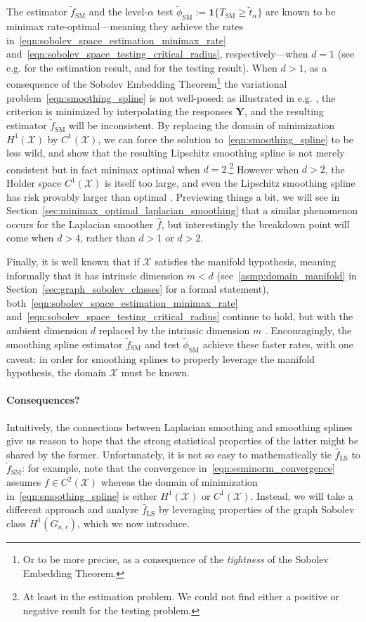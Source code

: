 \documentclass{article}
\newcommand{\1}{\mathbf{1}}
\newcommand{\Xset}{\mathcal{X}}
\newcommand{\wt}[1]{\widetilde{#1}}
\newcommand{\wh}[1]{\widehat{#1}}
\newcommand{\LS}{\mathrm{LS}}
\newcommand{\SM}{\mathrm{SM}}
\theoremstyle{alden}
\theoremstyle{aldenthm}
\theoremstyle{definition}
\theoremstyle{remark}
\begin{document}
The estimator $\wt{f}_{\SM}$ and the level-$\alpha$ test $\wt{\phi}_{\SM} := \1\{T_{\SM} \geq \wt{t}_{\alpha}\}$ are known to be minimax rate-optimal---meaning they achieve the rates in~\eqref{eqn:sobolev_space_estimation_minimax_rate} and~\eqref{eqn:sobolev_space_testing_critical_radius}, respectively---when $d = 1$ (see e.g. \cite{vandergeer2000} for the estimation result, and \cite{liu2019} for the testing result). When $d > 1$, as a consequence of the Sobolev Embedding Theorem\footnote{Or to be more precise, as a consequence of the \emph{tightness} of the Sobolev Embedding Theorem.} the variational problem~\eqref{eqn:smoothing_spline} is not well-posed: as illustrated in e.g. \cite{green93}, the criterion is minimized by interpolating the responses $\mathbf{Y}$, and the resulting estimator $\wt{f}_{\SM}$ will be inconsistent. By replacing the domain of minimization $H^1(\Xset)$ by $C^1(\Xset)$, we can force the solution to~\eqref{eqn:smoothing_spline} to be less wild, and \cite{birge1993} show that the resulting Lipschitz smoothing spline is not merely consistent but in fact minimax optimal when $d = 2$.\footnote{At least in the estimation problem. We could not find either a positive or negative result for the testing problem.} However when $d > 2$, the Holder space $C^1(\Xset)$ is itself too large, and even the Lipschitz smoothing spline has risk provably larger than optimal \cite{birge1993}. Previewing things a bit, we will see in Section~\ref{sec:minimax_optimal_laplacian_smoothing} that a similar phenomenon occurs for the Laplacian smoother $\wh{f}$, but interestingly the breakdown point will come when $d > 4$, rather than $d > 1$ or $d > 2$.

Finally, it is well known that if $\Xset$ satisfies the manifold hypothesis, meaning informally that it has intrinsic dimension $m < d$ (see~\ref{asmp:domain_manifold} in Section~\ref{sec:graph_sobolev_classes} for a formal statement), both~\eqref{eqn:sobolev_space_estimation_minimax_rate} and~\eqref{eqn:sobolev_space_testing_critical_radius} continue to hold, but with the ambient dimension $d$ replaced by the intrinsic dimension $m$ \citep{bickel2007,ingster2000}. Encouragingly, the smoothing spline estimator $\wt{f}_{\SM}$ and test $\wt{\phi}_{\SM}$ achieve these faster rates, with one caveat: in order for smoothing splines to properly leverage the manifold hypothesis, the domain $\Xset$ must be known.

\paragraph{Consequences?} Intuitively, the connections between Laplacian smoothing and smoothing splines give us reason to hope that the strong statistical properties of the latter might be shared by the former. Unfortunately, it is not so easy to mathematically tie $\wh{f}_{\LS}$ to $\wt{f}_{\SM}$: for example, note that the convergence in~\eqref{eqn:seminorm_convergence} assumes $f \in C^2(\Xset)$ whereas the domain of minimization in~\eqref{eqn:smoothing_spline} is either $H^1(\Xset)$ or $C^1(\Xset)$. Instead, we will take a different approach and analyze $\wh{f}_{\LS}$ by leveraging properties of the graph Sobolev class $H^1(G_{n,r})$, which we now introduce.
\end{document}
